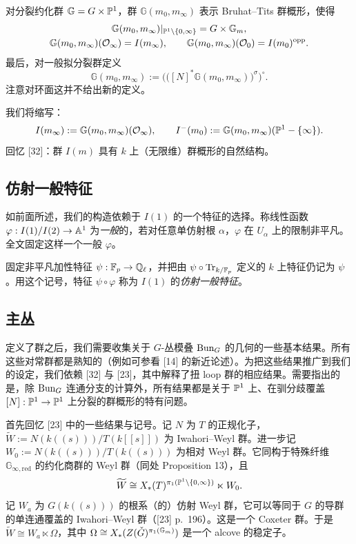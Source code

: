 对分裂约化群 $\mathbb{G}=G\times\mathbb{P}^1$，群 $\mathbb{G}(m_0,m_\infty)$ 表示 Bruhat--Tits 群概形，使得
\begin{gather*}
\mathbb{G}(m_0,m_\infty)|_{\mathbb{P}^1\setminus\{0,\infty\}}=G\times\mathbb{G}_m,\\
\mathbb{G}(m_0,m_\infty)(\mathcal O_\infty)=I(m_\infty),\qquad
\mathbb{G}(m_0,m_\infty)(\mathcal O_0)=I(m_0)^{\mathrm{opp}}.
\end{gather*}
最后，对一般拟分裂群定义
\[
\mathbb{G}(m_0,m_\infty):=\Big(\big([N]^*\mathbb{G}(m_0,m_\infty)\big)^\sigma\Big)^\circ.
\]
注意对环面这并不给出新的定义。

我们将缩写：
\[
I(m_\infty):=\mathbb{G}(m_0,m_\infty)(\mathcal O_\infty),\qquad
I^-(m_0):=\mathbb{G}(m_0,m_\infty)(\mathbb{P}^1-\{\infty\}).
\]
回忆 [32]：群 $I(m)$ 具有 $k$ 上（无限维）群概形的自然结构。

\subsection{仿射一般特征}

如前面所述，我们的构造依赖于 $I(1)$ 的一个特征的选择。称线性函数 $\varphi:I(1)/I(2)\to\mathbb{A}^1$ 为\emph{一般}的，若对任意单仿射根 $\alpha$，$\varphi$ 在 $U_\alpha$ 上的限制非平凡。全文固定这样一个一般 $\varphi$。

固定非平凡加性特征 $\psi:\mathbb{F}_p\to\mathbb{Q}_\ell$，并把由 $\psi\circ\mathrm{Tr}_{k/\mathbb{F}_p}$ 定义的 $k$ 上特征仍记为 $\psi$。用这个记号，特征 $\psi\circ\varphi$ 称为 $I(1)$ 的\emph{仿射一般特征}。

\subsection{主丛}

定义了群之后，我们需要收集关于 $G$-丛模叠 $\mathrm{Bun}_G$ 的几何的一些基本结果。所有这些对常群都是熟知的（例如可参看 [14] 的新近论述）。为把这些结果推广到我们的设定，我们依赖 [32] 与 [23]，其中解释了扭 loop 群的相应结果。需要指出的是，除 $\mathrm{Bun}_G$ 连通分支的计算外，所有结果都是关于 $\mathbb{P}^1$ 上、在驯分歧覆盖 $[N]:\mathbb{P}^1\to\mathbb{P}^1$ 上分裂的群概形的特有问题。

首先回忆 [23] 中的一些结果与记号。记 $N$ 为 $T$ 的正规化子，$\widetilde W:=N(k((s)))/T(k[[s]])$ 为 Iwahori--Weyl 群。进一步记 $W_0:=N(k((s)))/T(k((s)))$ 为相对 Weyl 群。它同构于特殊纤维 $\mathbb{G}_{\infty,\mathrm{red}}$ 的约化商群的 Weyl 群（同处 Proposition 13），且
\[
\widetilde W\cong X_*(T)^{\pi_1(\mathbb{P}^1\setminus\{0,\infty\})}\ltimes W_0.
\]
记 $W_a$ 为 $G(k((s)))$ 的根系（的）仿射 Weyl 群，它可以等同于 $G$ 的导群的单连通覆盖的 Iwahori--Weyl 群（[23] p.~196）。这是一个 Coxeter 群。于是 $\widetilde W\cong W_a\ltimes\Omega$，其中 $\Omega\cong X_*(Z(\check G)^{\pi_1(\mathbb{G}_m)})$ 是一个 alcove 的稳定子。


